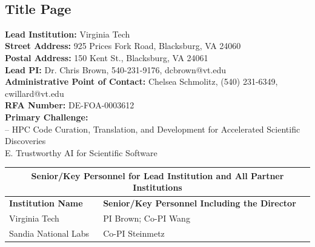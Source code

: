 \begin{center}
    \large{\proposalEighteen} \\ \vspace{0.5pt}
\end{center}\vspace{-15pt}

\subsection*{Title Page} \vspace{12pt}

\textbf{Lead Institution:} Virginia Tech \\

\noindent\textbf{Street Address:} 925 Prices Fork Road, Blacksburg, VA 24060 \\

\noindent\textbf{Postal Address:} 150 Kent St., Blacksburg, VA 24061\\

\noindent\textbf{Lead PI:} Dr. Chris Brown, 540-231-9176, dcbrown@vt.edu \\

\noindent\textbf{Administrative Point of Contact:} Chelsea Schmolitz, (540) 231-6349, cwillard@vt.edu \\

\noindent\textbf{RFA Number:} DE-FOA-0003612 \\

\noindent\textbf{Primary Challenge:} \\

 -- HPC Code Curation, Translation, and Development for Accelerated Scientific Discoveries \\
E. Trustworthy AI for Scientific Software \\

\begin{table}[h]
    \begin{tabular}{|l|l|}
    \hline
    \multicolumn{2}{|c|}{\textbf{Senior/Key Personnel for Lead Institution and All Partner Institutions}}  \\ \hline
        \textbf{Institution Name} & \textbf{Senior/Key Personnel Including the Director} \\ \hline
        Virginia Tech & PI Brown; Co-PI Wang \\ \hline
        Sandia National Labs & Co-PI Steinmetz \\ \hline
    \end{tabular}
    \label{tab:my_label}
\end{table}

